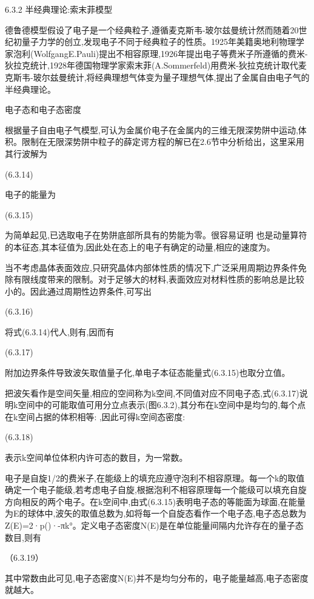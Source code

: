 6.3.2 半经典理论:索末菲模型

德鲁德模型假设了电子是一个经典粒子,遵循麦克斯韦-玻尔兹曼统计然而随着20世纪初量子力学的创立,发现电子不同于经典粒子的性质。1925年美籍奥地利物理学家泡利(WolfgangE.Pauli)提出不相容原理,1926年提出电子等费米子所遵循的费米-狄拉克统计,1928年德国物理学家索末菲(A.Sommerfeld)用费米-狄拉克统计取代麦克斯韦-玻尔兹曼统计,将经典理想气体变为量子理想气体,提出了金属自由电子气的半经典理论。

电子态和电子态密度

根据量子自由电子气模型,可认为金属价电子在金属内的三维无限深势阱中运动,体积。限制在无限深势阱中粒子的薛定谔方程的解已在2.6节中分析给出，这里采用其行波解为

 	(6.3.14)



电子的能量为

 	(6.3.15)

为简单起见,已选取电子在势阱底部所具有的势能为零。很容易证明 也是动量算符的本征态,其本征值为,因此处在态上的电子有确定的动量,相应的速度为。

当不考虑晶体表面效应,只研究晶体内部体性质的情况下,广泛采用周期边界条件免除有限线度带来的限制。对于足够大的材料,表面效应对材料性质的影响总是比较小的。因此通过周期性边界条件,可写出

 	(6.3.16)

将式(6.3.14)代人,则有,因而有

	 (6.3.17)

附加边界条件导致波矢取值量子化,单电子本征态能量式(6.3.15)也取分立值。

把波矢看作是空间矢量,相应的空间称为k空间,不同值对应不同电子态,式(6.3.17)说明k空间中的可能取值可用分立点表示(图6.3.2),其分布在k空间中是均匀的,每个点在k空间占据的体积相等: ,因此可得k空间态密度:

 	(6.3.18)



表示k空间单位体积内许可态的数目，为一常数。

电子是自旋1/2的费米子,在能级上的填充应遵守泡利不相容原理。每一个k的取值确定一个电子能级,若考虑电子自旋,根据泡利不相容原理每一个能级可以填充自旋方向相反的两个电子。在k空间中,由式(6.3.15)表明电子态的等能面为球面,在能量为E的球体中,波矢的取值总数为,如将每一个自旋态看作一个电子态,电子态总数为Z(E)=2·p()·-πk°。定义电子态密度N(E)是在单位能量间隔内允许存在的量子态数目,则有

	（6.3.19）

其中常数由此可见,电子态密度N(E)并不是均匀分布的，电子能量越高,电子态密度就越大。

